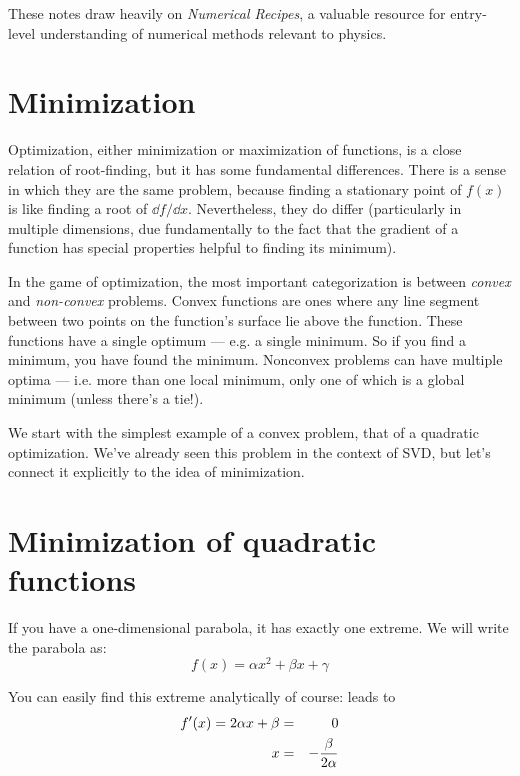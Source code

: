 These notes draw heavily on {\it Numerical Recipes}, a valuable
resource for entry-level understanding of numerical methods relevant
to physics.

\section{Minimization}

Optimization, either minimization or maximization of functions, is a
close relation of root-finding, but it has some fundamental
differences. There is a sense in which they are the same problem,
because finding a stationary point of $f(x)$ is like finding a root of
$\dd{f}/\dd{x}$. Nevertheless, they do differ (particularly in
multiple dimensions, due fundamentally to the fact that the gradient
of a function has special properties helpful to finding its minimum).

In the game of optimization, the most important categorization is
between {\it convex} and {\it non-convex} problems. Convex functions
are ones where any line segment between two points on the function's
surface lie above the function. These functions have a single optimum
--- e.g. a single minimum. So if you find a minimum, you have found
the minimum. Nonconvex problems can have multiple optima --- i.e. more
than one local minimum, only one of which is a global minimum (unless
there's a tie!).

We start with the simplest example of a convex problem, that of a
quadratic optimization. We've already seen this problem in the context
of SVD, but let's connect it explicitly to the idea of minimization.

\section{Minimization of quadratic functions}

If you have a one-dimensional parabola, it has exactly one
extreme. We will write the parabola as:
\begin{equation}
f(x) = \alpha x^2 + \beta x + \gamma
\end{equation}


\begin{answer}
You can easily find this extreme analytically of course:
leads to
\begin{eqnarray}
f'(x) =  2 \alpha x + \beta  &=& 0 \cr
x  &=& - \frac{\beta}{2\alpha} \cr
\end{eqnarray}
\end{answer}

